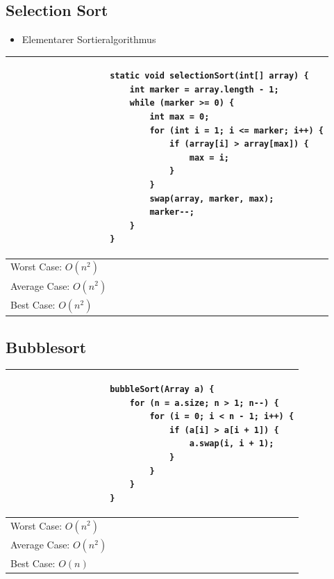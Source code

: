 \documentclass[a4paper, landscape, 8pt]{scrartcl}
\begin{document}
\begin{multicols*}{4}
            \subsection{Selection Sort}
                \begin{itemize}
                    \item Elementarer Sortieralgorithmus
                \end{itemize}
                \begin{tabular}{|l|}
                    \hline
                    \begin{lstlisting}
                    static void selectionSort(int[] array) {
                        int marker = array.length - 1;
                        while (marker >= 0) {
                            int max = 0;
                            for (int i = 1; i <= marker; i++) {
                                if (array[i] > array[max]) {
                                    max = i;
                                }
                            }
                            swap(array, marker, max);
                            marker--;
                        }
                    }
                    \end{lstlisting} \\
                    \hline
                    Worst Case: $O(n^2)$ \\
                    Average Case: $O(n^2)$ \\
                    Best Case: $O(n^2)$ \\
                    \hline
                \end{tabular}

            \subsection{Bubblesort}
                \begin{tabular}{|l|}
                    \hline
                    \begin{lstlisting}
                    bubbleSort(Array a) {
                        for (n = a.size; n > 1; n--) {
                            for (i = 0; i < n - 1; i++) {
                                if (a[i] > a[i + 1]) {
                                    a.swap(i, i + 1);
                                }
                            }
                        }
                    }
                    \end{lstlisting} \\
                    \hline
                    Worst Case: $O(n^2)$ \\
                    Average Case: $O(n^2)$ \\
                    Best Case: $O(n)$ \\
                    \hline
                \end{tabular}



\end{multicols*}
\end{document}
